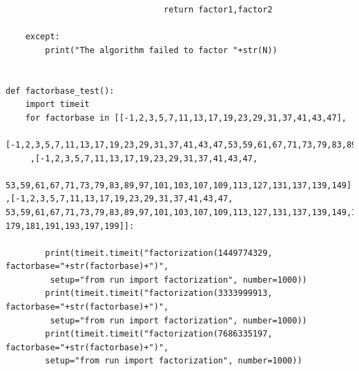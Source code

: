 \documentclass[10pt,a4paper]{report}
\begin{document}
\begin{verbatim}
                                return factor1,factor2

    except:
        print("The algorithm failed to factor "+str(N))


def factorbase_test():
    import timeit
    for factorbase in [[-1,2,3,5,7,11,13,17,19,23,29,31,37,41,43,47],
     [-1,2,3,5,7,11,13,17,19,23,29,31,37,41,43,47,53,59,61,67,71,73,79,83,89,97]
     ,[-1,2,3,5,7,11,13,17,19,23,29,31,37,41,43,47,
     53,59,61,67,71,73,79,83,89,97,101,103,107,109,113,127,131,137,139,149]
,[-1,2,3,5,7,11,13,17,19,23,29,31,37,41,43,47,
53,59,61,67,71,73,79,83,89,97,101,103,107,109,113,127,131,137,139,149,151,157,163,167,173,
179,181,191,193,197,199]]:

        print(timeit.timeit("factorization(1449774329, factorbase="+str(factorbase)+")",
         setup="from run import factorization", number=1000))
        print(timeit.timeit("factorization(3333999913, factorbase="+str(factorbase)+")",
         setup="from run import factorization", number=1000))
        print(timeit.timeit("factorization(7686335197, factorbase="+str(factorbase)+")", 
        setup="from run import factorization", number=1000))

\end{verbatim}
\end{document}
